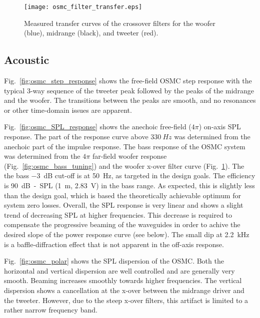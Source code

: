 \documentclass[12pt,a4paper]{article}
\providecommand{\figr}[1]{Fig.~\ref{fig:#1}}
\providecommand{\figlabel}[1]{\label{fig:#1}}
\begin{document}
\begin{figure}[tpb]
	\centering
	\texttt{[image: osmc\_filter\_transfer.eps]}
	\caption{Measured transfer curves of the crossover filters for the woofer (blue), midrange (black), and tweeter (red).}
	\figlabel{osmc_filter_transfer}
\end{figure}


\subsection{Acoustic}
\figr{osmc_step_response} shows the free-field OSMC step response with the typical 3-way sequence of the tweeter peak followed by the peaks of the midrange and the woofer. The transitions between the peaks are smooth, and no resonances or other time-domain issues are apparent.

\figr{osmc_SPL_response} shows the anechoic free-field ($4\pi$) on-axis SPL response. The part of the response curve above $\SI{330}{Hz}$ was determined from the anechoic part of the impulse response. The bass response of the OSMC system was determined from the $4\pi$ far-field woofer response (\figr{osmc_bass_tuning}) and the woofer x-over filter curve (\figr{osmc_filter_transfer}). The the bass \SI{-3}{dB} cut-off is at \SI{50}{Hz}, as targeted in the design goals. The efficiency is \SI{90}{dB-SPL} (\SI{1}{m}, \SI{2.83}{V}) in the bass range. As expected, this is slightly less than the design goal, which is based the theoretically achievable optimum for system zero losses. Overall, the SPL response is very linear and shows a slight trend of decreasing SPL at higher frequencies. This decrease is required to compensate the progressive beaming of the waveguides in order to achive the desired slope of the power response curve (see below). The small dip at \SI{2.2}{kHz} is a baffle-diffraction effect that is not apparent in the off-axis response.\par

\figr{osmc_polar} shows the SPL dispersion of the OSMC. Both the horizontal and vertical dispersion are well controlled and are generally very smooth. Beaming increases smoothly towards higher frequencies. The vertical dispersion shows a cancellation at the x-over between the midrange driver and the tweeter. However, due to the steep x-over filters, this artifact is limited to a rather narrow frequency band.\par
\end{document}
